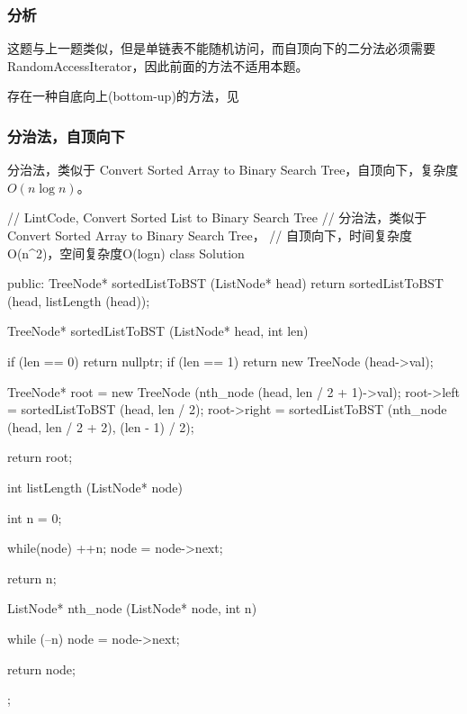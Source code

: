 \subsubsection{分析}
这题与上一题类似，但是单链表不能随机访问，而自顶向下的二分法必须需要RandomAccessIterator，因此前面的方法不适用本题。

存在一种自底向上(bottom-up)的方法，见


\subsubsection{分治法，自顶向下}
分治法，类似于 Convert Sorted Array to Binary Search Tree，自顶向下，复杂度$O(n\log n)$。
\begin{Code}
// LintCode, Convert Sorted List to Binary Search Tree
// 分治法，类似于 Convert Sorted Array to Binary Search Tree，
// 自顶向下，时间复杂度O(n^2)，空间复杂度O(logn)
class Solution {
public:
    TreeNode* sortedListToBST (ListNode* head) {
        return sortedListToBST (head, listLength (head));
    }

    TreeNode* sortedListToBST (ListNode* head, int len) {
        if (len == 0) return nullptr;
        if (len == 1) return new TreeNode (head->val);

        TreeNode* root = new TreeNode (nth_node (head, len / 2 + 1)->val);
        root->left = sortedListToBST (head, len / 2);
        root->right = sortedListToBST (nth_node (head, len / 2 + 2), 
                (len - 1) / 2);

        return root;
    }

    int listLength (ListNode* node) {
        int n = 0;

        while(node) {
            ++n;
            node = node->next;
        }

        return n;
    }

    ListNode* nth_node (ListNode* node, int n) {
        while (--n)
            node = node->next;

        return node;
    }
};
\end{Code}


